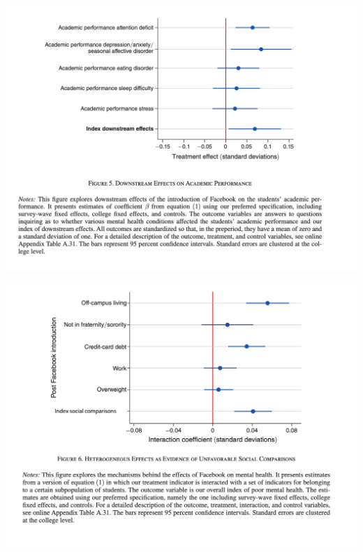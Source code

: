 \documentclass{beamer}
\begin{document}
\begin{frame}
\begin{center}
\includegraphics[scale=0.35]{./lecture_includes/facebook_6}
\end{center}
\end{frame}

\begin{frame}
\begin{center}
\includegraphics[scale=0.35]{./lecture_includes/facebook_7}
\end{center}
\end{frame}
\end{document}
